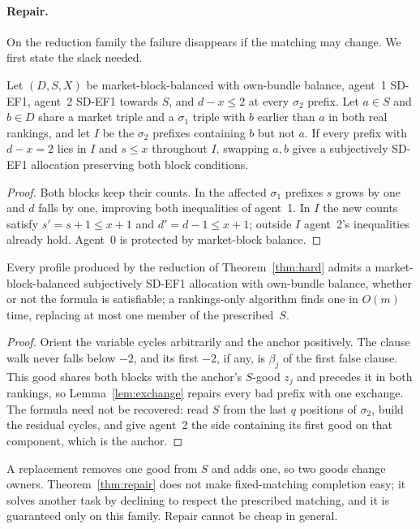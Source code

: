 \documentclass[sigconf,anonymous]{aamas}
\begin{document}
\paragraph{Repair.}
On the reduction family the failure disappears if the matching may change. We first state the slack needed.
\begin{lemma}\label{lem:exchange}
Let $(D,S,X)$ be market-block-balanced with own-bundle balance, agent~1 SD-EF1, agent~2 SD-EF1 towards $S$, and $d-x\le2$ at every $\sigma_2$ prefix. Let $a\in S$ and $b\in D$ share a market triple and a $\sigma_1$ triple with $b$ earlier than $a$ in both real rankings, and let $I$ be the $\sigma_2$ prefixes containing $b$ but not $a$. If every prefix with $d-x=2$ lies in $I$ and $s\le x$ throughout $I$, swapping $a,b$ gives a subjectively SD-EF1 allocation preserving both block conditions.
\end{lemma}
\begin{proof}
Both blocks keep their counts. In the affected $\sigma_1$ prefixes $s$ grows by one and $d$ falls by one, improving both inequalities of agent~1. In $I$ the new counts satisfy $s'=s+1\le x+1$ and $d'=d-1\le x+1$; outside $I$ agent~2's inequalities already hold. Agent~0 is protected by market-block balance.
\end{proof}
\begin{theorem}\label{thm:repair}
Every profile produced by the reduction of Theorem~\ref{thm:hard} admits a market-block-balanced subjectively SD-EF1 allocation with own-bundle balance, whether or not the formula is satisfiable; a rankings-only algorithm finds one in $O(m)$ time, replacing at most one member of the prescribed~$S$.
\end{theorem}
\begin{proof}
Orient the variable cycles arbitrarily and the anchor positively. The clause walk never falls below $-2$, and its first $-2$, if any, is $\beta_j$ of the first false clause. This good shares both blocks with the anchor's $S$-good $z_j$ and precedes it in both rankings, so Lemma~\ref{lem:exchange} repairs every bad prefix with one exchange. The formula need not be recovered: read $S$ from the last $q$ positions of $\sigma_2$, build the residual cycles, and give agent~2 the side containing its first good on that component, which is the anchor.
\end{proof}
A replacement removes one good from $S$ and adds one, so two goods change owners. Theorem~\ref{thm:repair} does not make fixed-matching completion easy; it solves another task by declining to respect the prescribed matching, and it is guaranteed only on this family. Repair cannot be cheap in general.
\end{document}
